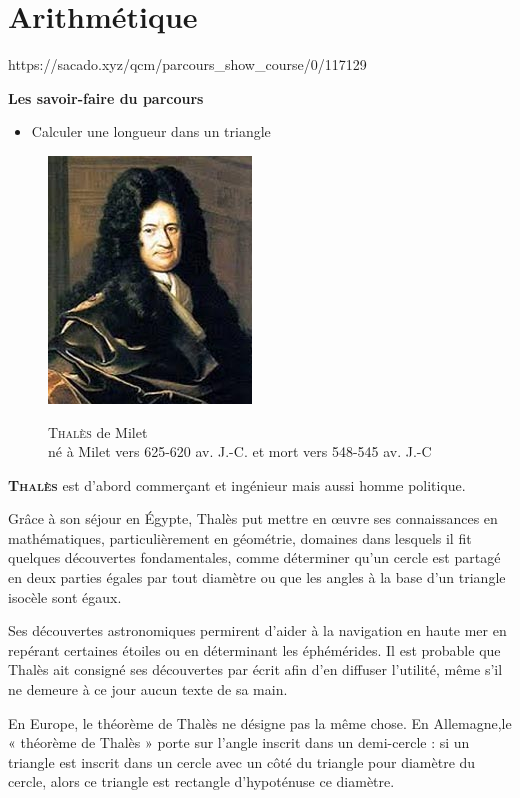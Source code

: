 \chapter{Arithmétique}
{https://sacado.xyz/qcm/parcours_show_course/0/117129}
{
 \begin{CpsCol}
\textbf{Les savoir-faire du parcours}
 \begin{itemize}
 \item Calculer une longueur dans un triangle
 \end{itemize}
 
 \end{CpsCol}
 
 \begin{His}
 
\begin{figure}
\vspace{-7mm}
\includegraphics[scale=0.5]{FIG/liebniz.jpg}

\begin{center}
  \textsc{Thalès} de Milet \\
  né à Milet vers 625-620 av. J.-C. et mort vers 548-545 av. J.-C
 \end{center} 
\end{figure}

\textbf{\textsc{Thalès}} est d'abord commerçant et ingénieur mais aussi homme politique.

Grâce à son séjour en Égypte, Thalès put mettre en œuvre ses connaissances en mathématiques, particulièrement en géométrie, domaines dans lesquels il fit quelques découvertes fondamentales, comme déterminer qu'un cercle est partagé en deux parties égales par tout diamètre ou que les angles à la base d'un triangle isocèle sont égaux. 

Ses découvertes astronomiques permirent d'aider à la navigation en haute mer en repérant certaines étoiles ou en déterminant les éphémérides. Il est probable que Thalès ait consigné ses découvertes par écrit afin d'en diffuser l'utilité, même s'il ne demeure à ce jour aucun texte de sa main.

En Europe, le théorème de Thalès ne désigne pas la même chose. En Allemagne,le « théorème de Thalès » porte sur l'angle inscrit dans un demi-cercle : si un triangle est inscrit dans un cercle avec un côté du triangle pour diamètre du cercle, alors ce triangle est rectangle d'hypoténuse ce diamètre.

 \end{His}

}





